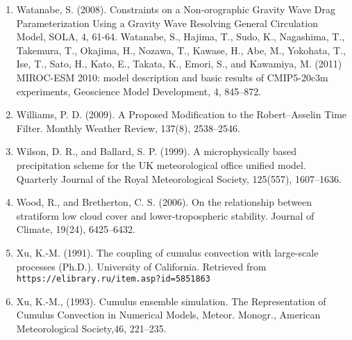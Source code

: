 \begin{enumerate}
\item Watanabe, S. (2008). Constraints on a Non-orographic Gravity Wave Drag Parameterization Using a Gravity Wave Resolving General Circulation Model, SOLA, 4, 61-64.
   Watanabe, S., Hajima, T., Sudo, K., Nagashima, T., Takemura, T., Okajima, H., Nozawa, T., Kawase, H., Abe, M., Yokohata, T., Ise, T., Sato, H., Kato, E., Takata, K., Emori, S., and Kawamiya, M. (2011) MIROC-ESM 2010: model description and basic results of CMIP5-20c3m experiments, Geoscience Model Development, 4, 845–872. 
\item Williams, P. D. (2009). A Proposed Modification to the Robert–Asselin Time Filter. Monthly Weather Review, 137(8), 2538–2546.
\item Wilson, D. R., and Ballard, S. P. (1999). A microphysically based precipitation scheme for the UK meteorological office unified model. Quarterly Journal of the Royal Meteorological Society, 125(557), 1607–1636.
\item Wood, R., and Bretherton, C. S. (2006). On the relationship between stratiform low cloud cover and lower-tropospheric stability. Journal of Climate, 19(24), 6425–6432.
\item Xu, K.-M. (1991). The coupling of cumulus convection with large-scale processes (Ph.D.). University of California. Retrieved from \\
\texttt{https://elibrary.ru/item.asp?id=5851863}
\item Xu, K.-M., (1993). Cumulus ensemble simulation. The Representation of Cumulus Convection in Numerical Models, Meteor. Monogr., American Meteorological Society,46, 221–235.
\end{enumerate}
